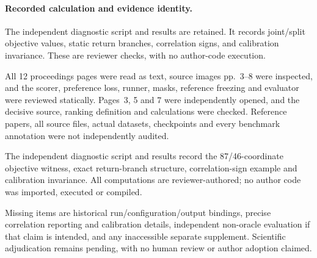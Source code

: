 \documentclass[10pt]{article}
\begin{document}
\paragraph*{Recorded calculation and evidence identity.}\mbox{}\par
The independent diagnostic script and results are retained. It records joint/split objective values, static return branches, correlation signs, and calibration invariance. These are reviewer checks, with no author-code execution.\par
All 12 proceedings pages were read as text, source images pp. 3–8 were inspected, and the scorer, preference loss, runner, masks, reference freezing and evaluator were reviewed statically. Pages 3, 5 and 7 were independently opened, and the decisive source, ranking definition and calculations were checked. Reference papers, all source files, actual datasets, checkpoints and every benchmark annotation were not independently audited.\par
The independent diagnostic script and results record the 87/46-coordinate objective witness, exact return-branch structure, correlation-sign example and calibration invariance. All computations are reviewer-authored; no author code was imported, executed or compiled.\par
Missing items are historical run/configuration/output bindings, precise correlation reporting and calibration details, independent non-oracle evaluation if that claim is intended, and any inaccessible separate supplement. Scientific adjudication remains pending, with no human review or author adoption claimed.\par
\end{document}

